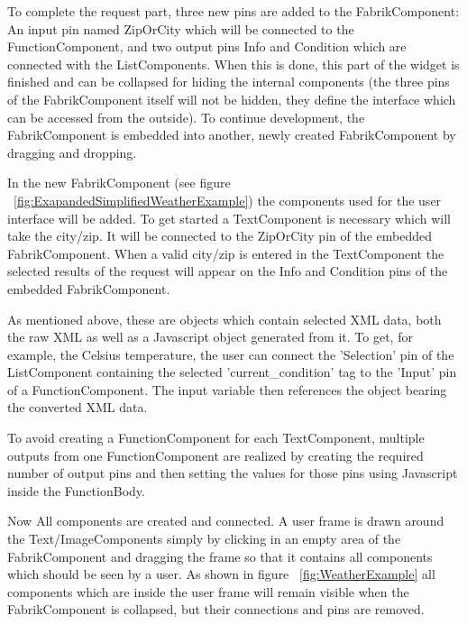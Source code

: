 \documentclass[pdftex, times, 10pt, twocolumn]{article}
\begin{document}
To complete the request part, three new pins are added to the FabrikComponent: An input pin named ZipOrCity which will be connected to the FunctionComponent, and two output pins Info and Condition which are connected with the ListComponents. When this is done, this part of the widget is finished and can be collapsed for hiding the internal components (the three pins of the FabrikComponent itself will not be hidden, they define the interface which can be accessed from the outside). To continue development, the FabrikComponent is embedded into another, newly created FabrikComponent by dragging and dropping. 

In the new FabrikComponent (see figure ~\ref{fig:ExapandedSimplifiedWeatherExample}) the components used for the user interface will be added. To get started a TextComponent is necessary which will take the city/zip. It will be connected to the ZipOrCity pin of the embedded FabrikComponent. When a valid city/zip is entered in the TextComponent the selected results of the request will appear on the Info and Condition pins of the embedded FabrikComponent. 

As mentioned above, these are objects which contain selected XML data, both the raw XML as well as a Javascript object generated from it. To get, for example, the Celsius temperature, the user can connect the 'Selection' pin of the ListComponent containing the selected 'current\_condition' tag to the 'Input' pin of a FunctionComponent. The input variable then references the object bearing the converted XML data.  

To avoid creating a FunctionComponent for each TextComponent, multiple outputs from one FunctionComponent are realized by creating the required number of output pins and then setting the values for those  pins using Javascript inside the FunctionBody. 

Now All components are created and connected. A user frame is drawn around the Text/ImageComponents simply by clicking in an empty area of the FabrikComponent and dragging the frame so that it contains all components which should be seen by a user. As shown in figure ~\ref{fig:WeatherExample} all components which are inside the user frame will remain visible when the FabrikComponent is collapsed, but their connections and pins are removed. 
\end{document}
